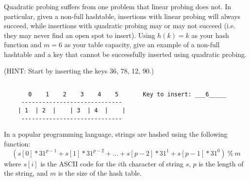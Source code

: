 \documentclass[12pt]{exam}
\begin{document}
\begin{questions}
\begin{parts}
Quadratic probing suffers from one problem that linear probing does not.
In particular, given a non-full hashtable, insertions with linear probing will always
succeed, while insertions with quadratic probing may or may not succeed (i.e. they may
never find an open spot to insert).
Using $h(k) = k$ as your hash function and $m = 6$ as your table capacity,
give an example of a non-full hashtable and a key that cannot be successfully inserted
using quadratic probing.

\begin{solution}
(HINT: Start by inserting the keys 36, 78, 12, 90.)
\begin{verbatim}

       0    1    2    3    4    5       Key to insert: ___6_____
     -----------------------------
    | 1  | 2  |    | 3  | 4  |    |
     -----------------------------
\end{verbatim}
\end{solution}

\end{parts}

\newpage
{}

In a popular programming language, strings are hashed using the following function:
\[
(s[0]*31^{p-1} + s[1]*31^{p-2} + ... + s[p-2]*31^1 + s[p-1]*31^0)
\ \texttt{\%}\  m
\]
where $s[i]$ is the ASCII code for the $i$th character of string $s$, $p$ is the length of the string,
and $m$ is the size of the hash table.




\end{questions}
\end{document}
